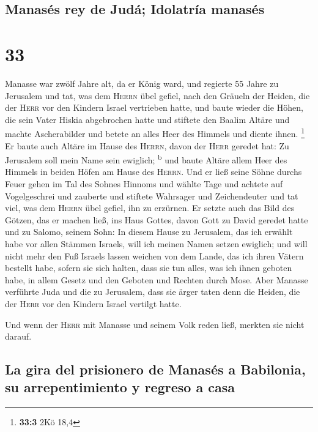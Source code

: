 \hypertarget{manasuxe9s-rey-de-juduxe1-idolatruxeda-manasuxe9s}{%
\subsection{Manasés rey de Judá; Idolatría
manasés}\label{manasuxe9s-rey-de-juduxe1-idolatruxeda-manasuxe9s}}

\hypertarget{section-32}{%
\section{33}\label{section-32}}

 Manasse war zwölf Jahre alt, da er König ward, und
regierte 55 Jahre zu Jerusalem  und tat, was dem
\textsc{Herrn} übel gefiel, nach den Gräueln der Heiden, die der
\textsc{Herr} vor den Kindern Israel vertrieben hatte, 
und baute wieder die Höhen, die sein Vater Hiskia abgebrochen hatte und
stiftete den Baalim Altäre und machte Ascherabilder und betete an alles
Heer des Himmels und diente ihnen. \footnote{\textbf{33:3} 2Kö 18,4}
 Er baute auch Altäre im Hause des \textsc{Herrn}, davon
der \textsc{Herr} geredet hat: Zu Jerusalem soll mein Name sein
ewiglich; \textsuperscript{b}  und baute Altäre allem Heer
des Himmels in beiden Höfen am Hause des \textsc{Herrn}. 
Und er ließ seine Söhne durchs Feuer gehen im Tal des Sohnes Hinnoms und
wählte Tage und achtete auf Vogelgeschrei und zauberte und stiftete
Wahrsager und Zeichendeuter und tat viel, was dem \textsc{Herrn} übel
gefiel, ihn zu erzürnen.  Er setzte auch das Bild des
Götzen, das er machen ließ, ins Haus Gottes, davon Gott zu David geredet
hatte und zu Salomo, seinem Sohn: In diesem Hause zu Jerusalem, das ich
erwählt habe vor allen Stämmen Israels, will ich meinen Namen setzen
ewiglich;  und will nicht mehr den Fuß Israels lassen
weichen von dem Lande, das ich ihren Vätern bestellt habe, sofern sie
sich halten, dass sie tun alles, was ich ihnen geboten habe, in allem
Gesetz und den Geboten und Rechten durch Mose.  Aber
Manasse verführte Juda und die zu Jerusalem, dass sie ärger taten denn
die Heiden, die der \textsc{Herr} vor den Kindern Israel vertilgt hatte.

 Und wenn der \textsc{Herr} mit Manasse und seinem Volk
reden ließ, merkten sie nicht darauf.

\hypertarget{la-gira-del-prisionero-de-manasuxe9s-a-babilonia-su-arrepentimiento-y-regreso-a-casa}{%
\subsection{La gira del prisionero de Manasés a Babilonia, su
arrepentimiento y regreso a
casa}\label{la-gira-del-prisionero-de-manasuxe9s-a-babilonia-su-arrepentimiento-y-regreso-a-casa}}

